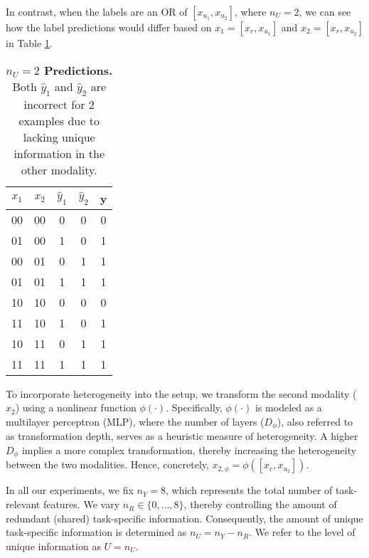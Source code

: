 In contrast, when the labels are an OR of $[x_{u_1}, x_{u_2}]$, where $n_U=2$, we can see how the label predictions would differ based on $x_1 = [x_r, x_{u_1}]$ and $x_2 = [x_r, x_{u_2}]$ in Table \ref{tab:u=2}.
\begin{table}[ht!]
    \centering
    \begin{tabular}{c|c|c|c|c}
       $x_1$  & $x_2$  & $\hat{y}_1$ & $\hat{y}_2$ & y\\
       \hline
        00 & 00 & 0 & 0 & 0 \\
        01 & 00 & 1 & 0 & 1\\
        00 & 01 & 0 & 1 & 1\\ 
        01 & 01 & 1 & 1 & 1\\ 
        10 & 10 & 0 & 0 & 0\\ 
        11 & 10 & 1 & 0 & 1 \\ 
        10 & 11 & 0 & 1 & 1\\ 
        11 & 11 & 1 & 1 & 1\\
        
    \end{tabular}
    \caption{\textbf{$n_U=2$ Predictions.} Both $\hat{y}_1$ and $\hat{y}_2$ are incorrect for 2 examples due to lacking unique information in the other modality.}
    \label{tab:u=2}
\end{table}


To incorporate heterogeneity into the setup, we transform the second modality (\(x_2\)) using a nonlinear function \(\phi(\cdot)\). Specifically, \(\phi(\cdot)\) is modeled as a multilayer perceptron (MLP), where the number of layers (\(D_{\phi}\)), also referred to as transformation depth, serves as a heuristic measure of heterogeneity. A higher \(D_{\phi}\) implies a more complex transformation, thereby increasing the heterogeneity between the two modalities. Hence, concretely, \(x_{2, \phi} = \phi([x_c, x_{u_2}])\).

In all our experiments, we fix \(n_Y = 8\), which represents the total number of task-relevant features. We vary \(n_R \in \{0, \ldots, 8\}\), thereby controlling the amount of redundant (shared) task-specific information. Consequently, the amount of unique task-specific information is determined as \(n_U = n_Y - n_R\). We refer to the level of unique information as $U = n_U$.


